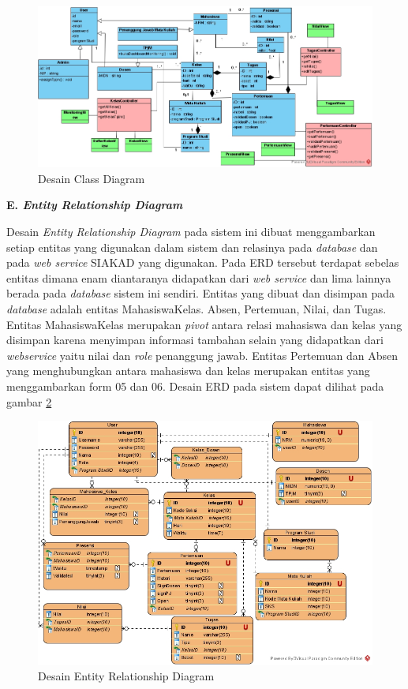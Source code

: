 \begin{figure}[H]
	\centering
	\includegraphics[width=1\textwidth]{gambar/diagram/Class Diagram Fix}
	\caption{Desain Class Diagram}
	\label{fig:classdiagram}
\end{figure}


\textbf{E. \textit{Entity Relationship Diagram}}

	Desain \textit{Entity Relationship Diagram} pada sistem ini dibuat menggambarkan setiap entitas yang digunakan dalam sistem dan relasinya pada \textit{database} dan pada \textit{web service} SIAKAD yang digunakan. Pada ERD tersebut terdapat sebelas entitas dimana enam diantaranya didapatkan dari \textit{web service} dan lima lainnya berada pada \textit{database} sistem ini sendiri. Entitas yang dibuat dan disimpan pada \textit{database} adalah entitas MahasiswaKelas. Absen, Pertemuan, Nilai, dan Tugas. Entitas MahasiswaKelas merupakan \textit{pivot} antara relasi mahasiswa dan kelas yang disimpan karena menyimpan informasi tambahan selain yang didapatkan dari \textit{webservice} yaitu nilai dan \textit{role} penanggung jawab. Entitas Pertemuan dan Absen yang menghubungkan antara mahasiswa dan kelas merupakan entitas yang menggambarkan form 05 dan 06. Desain ERD pada sistem dapat dilihat pada gambar \ref{fig:erd}

\begin{figure}[h!]
	\centering
	\includegraphics[width=1\textwidth]{gambar/diagram/Entity Relationship Diagram2}
	\caption{Desain Entity Relationship Diagram}
	\label{fig:erd}
\end{figure}


